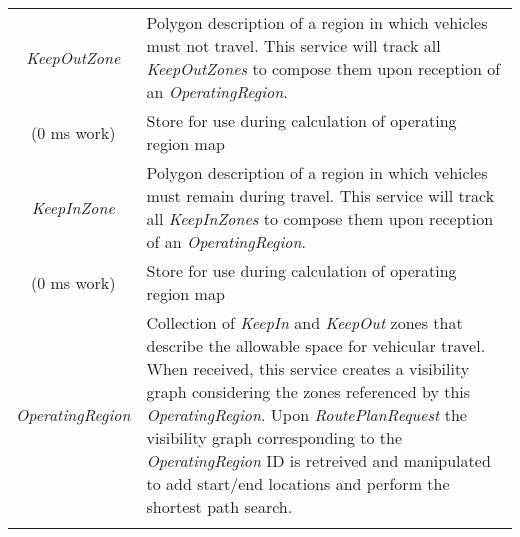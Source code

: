 \begin{longtable}[]{@{}cl@{}}
\begin{minipage}[t]{0.40\columnwidth}
\emph{KeepOutZone}\strut
\end{minipage} & \begin{minipage}[t]{0.55\columnwidth}\raggedright\strut
Polygon description of a region in which vehicles must not travel. This
service will track all \emph{KeepOutZones} to compose them upon
reception of an \emph{OperatingRegion}.\strut
\end{minipage}\tabularnewline
\begin{minipage}[t]{0.40\columnwidth}\centering\strut
(0 ms work)\strut
\end{minipage} & \begin{minipage}[t]{0.55\columnwidth}\raggedright\strut
Store for use during calculation of operating region map\strut
\end{minipage}\tabularnewline
\begin{minipage}[t]{0.40\columnwidth}\centering\strut
\emph{KeepInZone}\strut
\end{minipage} & \begin{minipage}[t]{0.55\columnwidth}\raggedright\strut
Polygon description of a region in which vehicles must remain during
travel. This service will track all \emph{KeepInZones} to compose them
upon reception of an \emph{OperatingRegion}.\strut
\end{minipage}\tabularnewline
\begin{minipage}[t]{0.40\columnwidth}\centering\strut
(0 ms work)\strut
\end{minipage} & \begin{minipage}[t]{0.55\columnwidth}\raggedright\strut
Store for use during calculation of operating region map\strut
\end{minipage}\tabularnewline
\begin{minipage}[t]{0.40\columnwidth}\centering\strut
\emph{OperatingRegion}\strut
\end{minipage} & \begin{minipage}[t]{0.55\columnwidth}\raggedright\strut
Collection of \emph{KeepIn} and \emph{KeepOut} zones that describe the
allowable space for vehicular travel. When received, this service
creates a visibility graph considering the zones referenced by this
\emph{OperatingRegion}. Upon \emph{RoutePlanRequest} the visibility
graph corresponding to the \emph{OperatingRegion} ID is retreived and
manipulated to add start/end locations and perform the shortest path
search.\strut
\end{minipage}\tabularnewline
\begin{minipage}[t]{0.40\columnwidth}\centering\strut

\end{minipage}
\end{longtable}
